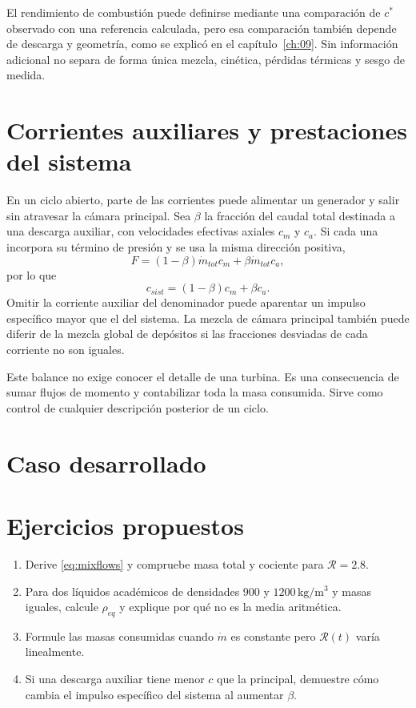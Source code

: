 El rendimiento de combustión puede definirse mediante una comparación de $c^*$ observado con una referencia calculada, pero esa comparación también depende de descarga y geometría, como se explicó en el capítulo~\ref{ch:09}. Sin información adicional no separa de forma única mezcla, cinética, pérdidas térmicas y sesgo de medida.
\section{Corrientes auxiliares y prestaciones del sistema}
En un ciclo abierto, parte de las corrientes puede alimentar un generador y salir sin atravesar la cámara principal. Sea $\beta$ la fracción del caudal total destinada a una descarga auxiliar, con velocidades efectivas axiales $c_m$ y $c_a$. Si cada una incorpora su término de presión y se usa la misma dirección positiva,
\[
 F=(1-\beta)\dot m_{tot}c_m+\beta\dot m_{tot}c_a,
\]
por lo que
\begin{equation}
 c_{sist}=(1-\beta)c_m+\beta c_a.
\end{equation}
Omitir la corriente auxiliar del denominador puede aparentar un impulso específico mayor que el del sistema. La mezcla de cámara principal también puede diferir de la mezcla global de depósitos si las fracciones desviadas de cada corriente no son iguales.

Este balance no exige conocer el detalle de una turbina. Es una consecuencia de sumar flujos de momento y contabilizar toda la masa consumida. Sirve como control de cualquier descripción posterior de un ciclo.
\section{Caso desarrollado}

\section{Ejercicios propuestos}
\begin{enumerate}
\item Derive \eqref{eq:mixflows} y compruebe masa total y cociente para $\mathcal R=2.8$.
\item Para dos líquidos académicos de densidades 900 y $1200\,\mathrm{kg/m^3}$ y masas iguales, calcule $\rho_{eq}$ y explique por qué no es la media aritmética.
\item Formule las masas consumidas cuando $\dot m$ es constante pero $\mathcal R(t)$ varía linealmente.
\item Si una descarga auxiliar tiene menor $c$ que la principal, demuestre cómo cambia el impulso específico del sistema al aumentar $\beta$.
\end{enumerate}


\studiumchaptercheck
